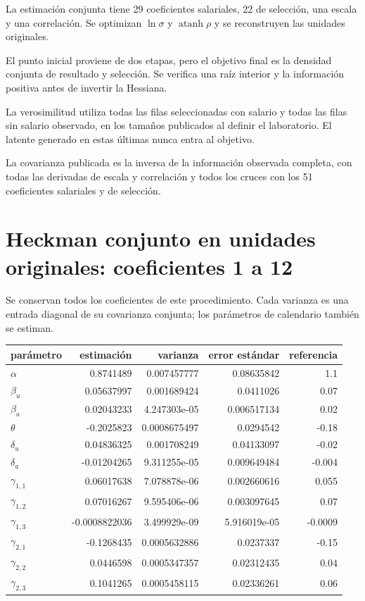 \documentclass[11pt,a4paper]{article}
\begin{document}
La estimación conjunta tiene 29 coeficientes salariales, 22 de selección, una escala y una correlación. Se optimizan $\ln\sigma$ y $\operatorname{atanh}\rho$ y se reconstruyen las unidades originales.

El punto inicial proviene de dos etapas, pero el objetivo final es la densidad conjunta de resultado y selección. Se verifica una raíz interior y la información positiva antes de invertir la Hessiana.

La verosimilitud utiliza todas las filas seleccionadas con salario y todas las filas sin salario observado, en los tamaños publicados al definir el laboratorio. El latente generado en estas últimas nunca entra al objetivo.

La covarianza publicada es la inversa de la información observada completa, con todas las derivadas de escala y correlación y todos los cruces con los 51 coeficientes salariales y de selección.

\clearpage
\section{Heckman conjunto en unidades originales: coeficientes 1 a 12}
Se conservan todos los coeficientes de este procedimiento. Cada varianza es una entrada diagonal de su covarianza conjunta; los parámetros de calendario también se estiman.
\begin{center}\small
\begin{tabular}{lrrrr}
\toprule
parámetro & estimación & varianza & error estándar & referencia\\\midrule
$\alpha$ & 0.8741489 & 0.007457777 & 0.08635842 & 1.1\\
$\beta_u$ & 0.05637997 & 0.001689424 & 0.0411026 & 0.07\\
$\beta_a$ & 0.02043233 & 4.247303e-05 & 0.006517134 & 0.02\\
$\theta$ & -0.2025823 & 0.0008675497 & 0.0294542 & -0.18\\
$\delta_u$ & 0.04836325 & 0.001708249 & 0.04133097 & -0.02\\
$\delta_a$ & -0.01204265 & 9.311255e-05 & 0.009649484 & -0.004\\
$\gamma_{1,1}$ & 0.06017638 & 7.078878e-06 & 0.002660616 & 0.055\\
$\gamma_{1,2}$ & 0.07016267 & 9.595406e-06 & 0.003097645 & 0.07\\
$\gamma_{1,3}$ & -0.0008822036 & 3.499929e-09 & 5.916019e-05 & -0.0009\\
$\gamma_{2,1}$ & -0.1268435 & 0.0005632886 & 0.0237337 & -0.15\\
$\gamma_{2,2}$ & 0.0446598 & 0.0005347357 & 0.02312435 & 0.04\\
$\gamma_{2,3}$ & 0.1041265 & 0.0005458115 & 0.02336261 & 0.06\\
\bottomrule
\end{tabular}\end{center}
\end{document}

